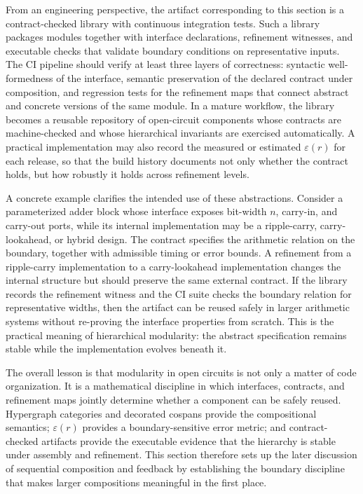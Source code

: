 \documentclass[11pt]{article}
\begin{document}
From an engineering perspective, the artifact corresponding to this section is a contract-checked library with continuous integration tests. Such a library packages modules together with interface declarations, refinement witnesses, and executable checks that validate boundary conditions on representative inputs. The CI pipeline should verify at least three layers of correctness: syntactic well-formedness of the interface, semantic preservation of the declared contract under composition, and regression tests for the refinement maps that connect abstract and concrete versions of the same module. In a mature workflow, the library becomes a reusable repository of open-circuit components whose contracts are machine-checked and whose hierarchical invariants are exercised automatically. A practical implementation may also record the measured or estimated \(\varepsilon(r)\) for each release, so that the build history documents not only whether the contract holds, but how robustly it holds across refinement levels.

A concrete example clarifies the intended use of these abstractions. Consider a parameterized adder block whose interface exposes bit-width \(n\), carry-in, and carry-out ports, while its internal implementation may be a ripple-carry, carry-lookahead, or hybrid design. The contract specifies the arithmetic relation on the boundary, together with admissible timing or error bounds. A refinement from a ripple-carry implementation to a carry-lookahead implementation changes the internal structure but should preserve the same external contract. If the library records the refinement witness and the CI suite checks the boundary relation for representative widths, then the artifact can be reused safely in larger arithmetic systems without re-proving the interface properties from scratch. This is the practical meaning of hierarchical modularity: the abstract specification remains stable while the implementation evolves beneath it.

The overall lesson is that modularity in open circuits is not only a matter of code organization. It is a mathematical discipline in which interfaces, contracts, and refinement maps jointly determine whether a component can be safely reused. Hypergraph categories and decorated cospans provide the compositional semantics; \(\varepsilon(r)\) provides a boundary-sensitive error metric; and contract-checked artifacts provide the executable evidence that the hierarchy is stable under assembly and refinement. This section therefore sets up the later discussion of sequential composition and feedback by establishing the boundary discipline that makes larger compositions meaningful in the first place.
\end{document}
